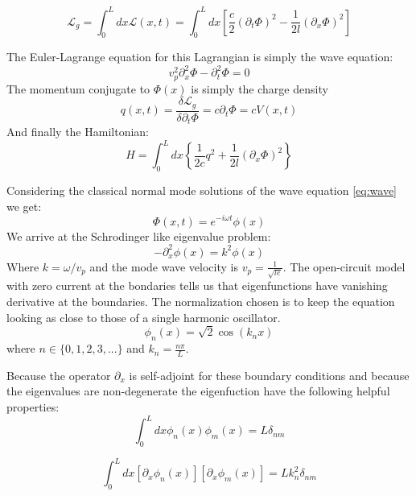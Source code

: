 \documentclass[12pt]{article}
\numberwithin{equation}{subsection}
\newcommand\page[1]{
{
}
}
\begin{document}
\begin{equation}
    \mathcal L_g = \int^L_0 dx \mathcal L(x,t) = \int ^L_0 dx \left [ \frac{c}{2}(\partial_t\Phi)^2 - \frac{1}{2l } (\partial _x\Phi)^2  \right]
    \label{eq:lag}
\end{equation}

The Euler-Lagrange equation for this Lagrangian is simply the wave equation:
\begin{equation}
v^2_p\partial^2_x\Phi - \partial ^2_t\Phi = 0
\label{eq:wave}
\end{equation}
The momentum conjugate to $\Phi(x)$ is simply the charge density
\begin{equation}
    q(x,t) = \frac{\delta \mathcal L_g}{\delta \partial_t \Phi} = c\partial_t \Phi = c V (x,t)
\end{equation}
And finally the Hamiltonian:
\begin{equation}
H = \int^L_0 dx \left \{ \frac{1}{2c} q^2 + \frac{1}{2l}(\partial_x\Phi )^2 \right \}
\end{equation}


Considering the classical normal mode solutions of the wave equation \ref{eq:wave} we get:
\begin{equation}
    \Phi (x,t) = e^{-i\omega t} \phi(x)
\end{equation}
We arrive at the Schrodinger like eigenvalue problem:
\begin{equation}
    -\partial^2_x\phi(x) = k^2\phi(x)
\end{equation}
Where $k=\omega/v_p$ and the mode wave velocity is $v_p = \frac{1}{\sqrt{le}}$.
The open-circuit model with zero current at the bondaries tells us that eigenfunctions have vanishing derivative at the boundaries. The normalization chosen is to keep the equation looking as close to those of a single harmonic oscillator.
\begin{equation}
    \phi_n(x) = \sqrt 2 \cos(k_n x )
\end{equation}
where $n \in \{0,1,2,3, ...\}$ and $k_n = \frac{n\pi}{L}$. 
\page{28}
Because the operator $\partial_x$ is self-adjoint for these boundary conditions and because the eigenvalues are non-degenerate the eigenfuction have the following helpful properties:
\begin{equation}
\int^L_0 dx \phi_n(x)\phi_m(x) = L \delta_{nm}    
\end{equation}

\begin{equation}
\int^L_0 dx [\partial_x\phi_n(x)][\partial_x\phi_m(x)] = Lk^2_n \delta_{nm}    
\end{equation}
\end{document}
